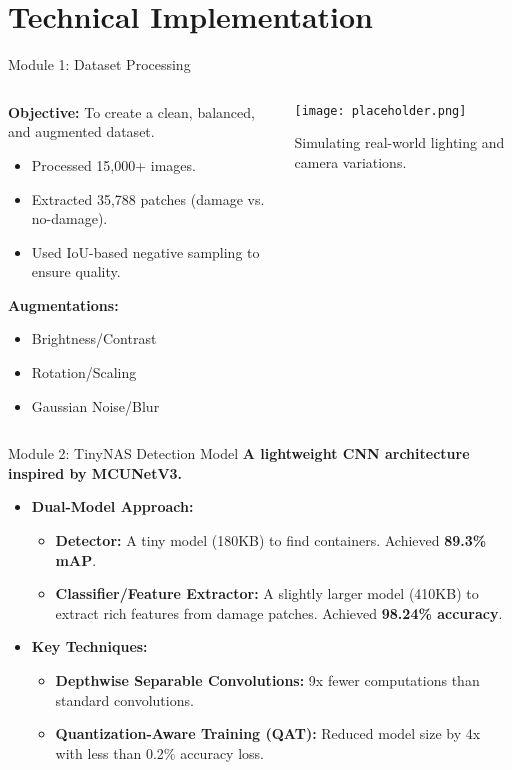 \documentclass{beamer}
\begin{document}
\section{Technical Implementation}
\begin{frame}{Module 1: Dataset Processing}
    \begin{columns}
        \begin{column}{0.5\textwidth}
            \textbf{Objective:} To create a clean, balanced, and augmented dataset.
            \begin{itemize}
                \item Processed 15,000+ images.
                \item Extracted 35,788 patches (damage vs. no-damage).
                \item Used IoU-based negative sampling to ensure quality.
            \end{itemize}
            \textbf{Augmentations:}
            \begin{itemize}
                \item Brightness/Contrast
                \item Rotation/Scaling
                \item Gaussian Noise/Blur
            \end{itemize}
        \end{column}
        \begin{column}{0.5\textwidth}
            \texttt{[image: placeholder.png]} %
            \caption{Simulating real-world lighting and camera variations.}
        \end{column}
    \end{columns}
\end{frame}

\begin{frame}{Module 2: TinyNAS Detection Model}
    \textbf{A lightweight CNN architecture inspired by MCUNetV3.}
    \begin{itemize}
        \item \textbf{Dual-Model Approach:}
        \begin{itemize}
            \item \textbf{Detector:} A tiny model (180KB) to find containers. Achieved \textbf{89.3\% mAP}.
            \item \textbf{Classifier/Feature Extractor:} A slightly larger model (410KB) to extract rich features from damage patches. Achieved \textbf{98.24\% accuracy}.
        \end{itemize}
        \item \textbf{Key Techniques:}
        \begin{itemize}
            \item \textbf{Depthwise Separable Convolutions:} 9x fewer computations than standard convolutions.
            \item \textbf{Quantization-Aware Training (QAT):} Reduced model size by 4x with less than 0.2\% accuracy loss.
        \end{itemize}
    \end{itemize}
\end{frame}
\end{document}
